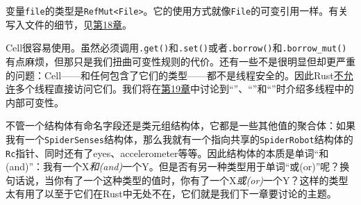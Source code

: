 变量\texttt{file}的类型是\texttt{RefMut<File>}。它的使用方式就像\texttt{File}的可变引用一样。有关写入文件的细节，见\hyperref[ch18]{第18章}。

Cell很容易使用。虽然必须调用\texttt{.get()}和\texttt{.set()}或者\texttt{.borrow()}和\texttt{.borrow\_mut()}有点麻烦，但那只是我们扭曲可变性规则的代价。还有一些不是很明显但却更严重的问题：Cell——和任何包含了它们的类型——都不是线程安全的。因此Rust\hyperref[threadsafe]{不允许}多个线程直接访问它们。我们将在\hyperref[ch19]{第19章}中讨论到“”、“”和“”时介绍多线程中的内部可变性。

不管一个结构体有命名字段还是类元组结构体，它都是一些其他值的聚合体：如果我有一个\texttt{SpiderSenses}结构体，那么我就有一个指向共享的\texttt{SpiderRobot}结构体的\texttt{Rc}指针、同时还有了eyes、accelerometer等等。因此结构体的本质是单词“和(and)”：我有一个X\emph{和(and)}一个Y。但是否有另一种类型用于单词“或(or)”呢？换句话说，当你有了一个这种类型的值时，你有了一个X\emph{或(or)}一个Y？这样的类型太有用了以至于它们在Rust中无处不在，它们就是我们下一章要讨论的主题。
